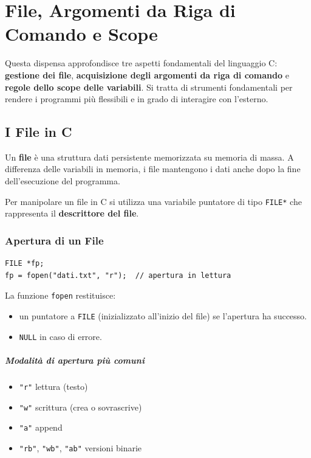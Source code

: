 \documentclass[oneside]{scrbook}
\begin{document}
\chapter{File, Argomenti da Riga di Comando e Scope}

Questa dispensa approfondisce tre aspetti fondamentali del linguaggio C:
\textbf{gestione dei file}, \textbf{acquisizione degli argomenti da riga di comando} e \textbf{regole dello scope delle variabili}.
Si tratta di strumenti fondamentali per rendere i programmi più flessibili e in grado di interagire con l'esterno.

\section{I File in C}

Un \textbf{file} è una struttura dati persistente memorizzata su memoria di massa.
A differenza delle variabili in memoria, i file mantengono i dati anche dopo la fine dell'esecuzione del programma.

Per manipolare un file in C si utilizza una variabile puntatore di tipo \texttt{FILE*} che rappresenta il \textbf{descrittore del file}.

\subsection{Apertura di un File}

\begin{lstlisting}[style=cstyle]
FILE *fp;
fp = fopen("dati.txt", "r");  // apertura in lettura
\end{lstlisting}

La funzione \texttt{fopen} restituisce:
\begin{itemize}
    \item un puntatore a \texttt{FILE} (inizializzato all'inizio del file) se l'apertura ha successo.
    \item \texttt{NULL} in caso di errore.
\end{itemize}

\paragraph{Modalità di apertura più comuni}
\begin{itemize}
    \item \texttt{"r"} lettura (testo)
    \item \texttt{"w"} scrittura (crea o sovrascrive)
    \item \texttt{"a"} append
    \item \texttt{"rb"}, \texttt{"wb"}, \texttt{"ab"} versioni binarie
\end{itemize}
\end{document}
